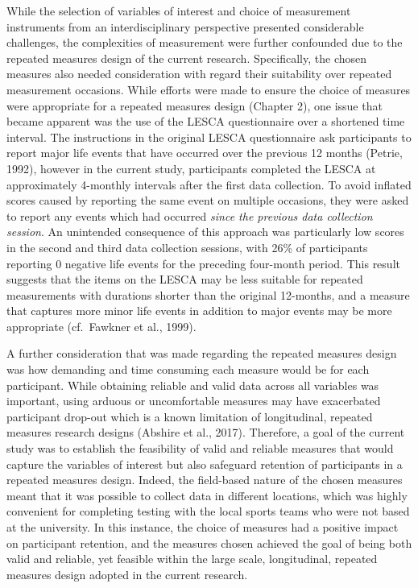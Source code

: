\documentclass[man,floatsintext]{apa6}
\begin{document}
While the selection of variables of interest and choice of measurement instruments from an interdisciplinary perspective presented considerable challenges, the complexities of measurement were further confounded due to the repeated measures design of the current research.
Specifically, the chosen measures also needed consideration with regard their suitability over repeated measurement occasions.
While efforts were made to ensure the choice of measures were appropriate for a repeated measures design (Chapter 2), one issue that became apparent was the use of the LESCA questionnaire over a shortened time interval.
The instructions in the original LESCA questionnaire ask participants to report major life events that have occurred over the previous 12 months (Petrie, 1992),
however in the current study, participants completed the LESCA at approximately 4-monthly intervals after the first data collection.
To avoid inflated scores caused by reporting the same event on multiple occasions,
they were asked to report any events which had occurred \emph{since the previous data collection session}.
An unintended consequence of this approach was particularly low scores in the second and third data collection sessions, with 26\% of participants reporting 0 negative life events for the preceding four-month period.
This result suggests that the items on the LESCA may be less suitable for repeated measurements with durations shorter than the original 12-months, and a measure that captures more minor life events in addition to major events may be more appropriate (cf.~Fawkner et al., 1999).

A further consideration that was made regarding the repeated measures design was how demanding and time consuming each measure would be for each participant.
While obtaining reliable and valid data across all variables was important, using arduous or uncomfortable measures may have exacerbated participant drop-out which is a known limitation of longitudinal, repeated measures research designs (Abshire et al., 2017).
Therefore, a goal of the current study was to establish the feasibility of valid and reliable measures that would capture the variables of interest but also safeguard retention of participants in a repeated measures design.
Indeed, the field-based nature of the chosen measures meant that it was possible to collect data in different locations, which was highly convenient for completing testing with the local sports teams who were not based at the university.
In this instance, the choice of measures had a positive impact on participant retention, and the measures chosen achieved the goal of being both valid and reliable, yet feasible within the large scale, longitudinal, repeated measures design adopted in the current research.
\end{document}
